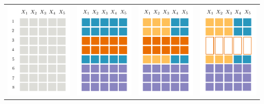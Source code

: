 \documentclass[xcolor={usenames,dvipsnames,svgnames}, compress]{beamer}
\begin{document}
\begin{frame}
  \begin{table}[ht]
    \centering
    \begin{tabular}{l l l l}
      \includegraphics[width=0.228\linewidth]{figures/grid-0}&
                                                              \includegraphics[width=0.2\linewidth]{figures/grid-1}&
                                                                                                                      \includegraphics[width=0.2\linewidth]{figures/grid-2}&
                                                                                                                                                                              \includegraphics[width=0.208\linewidth]{figures/grid-3}\\

\end{tabular}
\end{table}
\end{frame}
\end{document}
